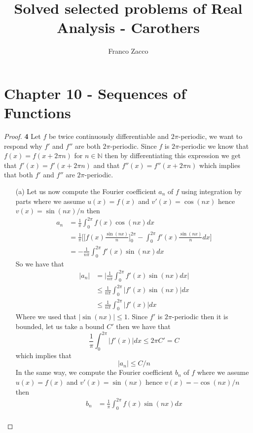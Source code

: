 \documentclass[11pt]{article}
\title{\textbf{Solved selected problems of Real Analysis - Carothers}}
\author{Franco Zacco}
\date{}
\newcommand{\N}{\mathbb{N}}
\theoremstyle{definition}
\begin{document}
\maketitle
\thispagestyle{empty}

\section*{Chapter 10 - Sequences of Functions}

\begin{proof}{\textbf{4}}
    Let $f$ be twice continuously differentiable and $2\pi$-periodic,
    we want to respond why $f'$ and $f''$ are both $2\pi$-periodic.
    Since $f$ is $2\pi$-periodic we know that $f(x) = f(x + 2\pi n)$ for
    $n \in \N$ then by differentiating this expression we get that
    $f'(x) = f'(x + 2\pi n)$ and that $f''(x) = f''(x + 2\pi n)$
    which implies that both $f'$ and $f''$ are $2\pi$-periodic.
    \begin{itemize}
    \item [(a)] Let us now compute the Fourier coefficient $a_n$ of $f$ using
    integration by parts where we assume $u(x) = f(x)$ and $v'(x) = \cos(nx)$
    hence $v(x) = \sin(nx) /n$ then
    \begin{align*}
        a_n &= \frac{1}{\pi}\int_0^{2\pi}f(x) \cos(nx) dx\\
        &= \frac{1}{\pi}\bigg[\bigg[f(x)\frac{\sin(nx)}{n}\bigg]_0^{2\pi}
        - \int_0^{2\pi}f'(x) \frac{\sin(nx)}{n} dx\bigg]\\
        &= -\frac{1}{n\pi}\int_0^{2\pi}f'(x) \sin(nx) dx
    \end{align*}
    So we have that 
    \begin{align*}
        |a_n| &= \bigg|\frac{1}{n\pi}\int_0^{2\pi}f'(x) \sin(nx) dx\bigg|\\
        &\leq \frac{1}{n\pi}\int_0^{2\pi}|f'(x)\sin(nx)| dx\\
        &\leq \frac{1}{n\pi}\int_0^{2\pi}|f'(x)| dx
    \end{align*}
    Where we used that $|\sin(nx)| \leq 1$. Since $f'$ is $2\pi$-periodic
    then it is bounded, let us take a bound $C'$ then
    we have that
    $$\frac{1}{\pi}\int_0^{2\pi}|f'(x)| dx \leq 2\pi C' = C$$
    which implies that 
    $$|a_n| \leq C/n$$
    \cleardoublepage
    In the same way, we compute the Fourier coefficient $b_n$ of $f$
    where we assume $u(x) = f(x)$ and $v'(x) = \sin(nx)$
    hence $v(x) = -\cos(nx)/n$ then
    \begin{align*}
        b_n &= \frac{1}{\pi}\int_0^{2\pi}f(x) \sin(nx) dx\\

\end{align*}
\end{itemize}
\end{proof}
\end{document}
